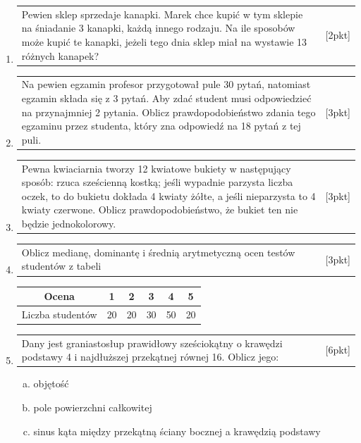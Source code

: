 \documentclass[12pt,a4paper]{article}
\begin{document}
\begin{enumerate}[1.]
		\item  \begin{tabular}{p{13cm} r}
			Pewien sklep sprzedaje kanapki. Marek chce kupić w tym sklepie na śniadanie 3 kanapki, każdą innego rodzaju. Na ile sposobów może kupić te kanapki, jeżeli tego dnia sklep miał na wystawie 13 różnych kanapek?&[2pkt]\\ 
		\end{tabular}
	
		\item  \begin{tabular}{p{13cm} r}
			Na pewien egzamin profesor przygotował pule 30 pytań, natomiast egzamin składa się z 3 pytań. Aby zdać student musi odpowiedzieć na przynajmniej 2 pytania. Oblicz prawdopodobieństwo zdania tego egzaminu przez studenta, który zna odpowiedź na 18 pytań z tej puli.&[3pkt]\\ 
		\end{tabular}
	
		\item  \begin{tabular}{p{13cm} r}
			Pewna kwiaciarnia tworzy 12 kwiatowe bukiety w następujący sposób: rzuca sześcienną kostką; jeśli wypadnie parzysta liczba oczek, to do bukietu dokłada 4 kwiaty żółte, a jeśli nieparzysta to 4 kwiaty czerwone. Oblicz prawdopodobieństwo, że bukiet ten nie będzie jednokolorowy.&[3pkt]\\ 
		\end{tabular}
	
		\item  \begin{tabular}{p{13cm} r}
			Oblicz medianę, dominantę i średnią arytmetyczną ocen testów studentów z tabeli &[3pkt]\\ 
		\end{tabular}
		
		\begin{tabular}{|c|c|c|c|c|c|}
			\hline
			Ocena&1&2&3&4&5\\
			\hline
			Liczba studentów&20&20&30&50&20\\
			\hline
		\end{tabular}
	
		\item  \begin{tabular}{p{13cm} r}
			Dany jest graniastosłup prawidłowy sześciokątny o krawędzi podstawy 4 i najdłuższej przekątnej równej 16. Oblicz jego:&[6pkt]\\ 
		\end{tabular}
		\begin{enumerate}[a)]
			\item objętość
			\item pole powierzchni całkowitej
			\item sinus kąta między przekątną ściany bocznej a krawędzią podstawy
		\end{enumerate}
	

\end{enumerate}
\end{document}

